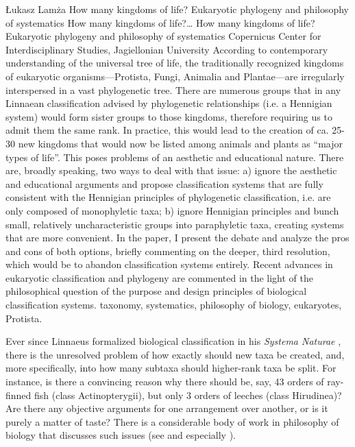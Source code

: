 \begin{artengenv}
	{Łukasz Lamża}
	{How many kingdoms of life? Eukaryotic phylogeny and philosophy of systematics}
	{How many kingdoms of life?\ldots}
	{How many kingdoms of life? Eukaryotic phylogeny and philosophy of systematics}
	{Copernicus Center for Interdisciplinary Studies, Jagiellonian University}
	{According to contemporary understanding of the universal tree of life, the traditionally recognized kingdoms of
		eukaryotic organisms---Protista, Fungi, Animalia and Plantae---are irregularly interspersed in a vast phylogenetic
		tree. There are numerous groups that in any Linnaean classification advised by phylogenetic relationships (i.e. a
		Hennigian system) would form sister groups to those kingdoms, therefore requiring us to admit them the same rank. In
		practice, this would lead to the creation of ca. 25-30 new kingdoms that would now be listed among animals and plants
		as ``major types of life''. This poses problems of an aesthetic and educational nature. There are, broadly speaking, two
		ways to deal with that issue: a) ignore the aesthetic and educational arguments and propose classification systems that
		are fully consistent with the Hennigian principles of phylogenetic classification, i.e. are only composed of
		monophyletic taxa; b) ignore Hennigian principles and bunch small, relatively uncharacteristic groups into paraphyletic
		taxa, creating systems that are more convenient. In the paper, I present the debate and analyze the pros and cons of
		both options, briefly commenting on the deeper, third resolution, which would be to abandon classification systems
		entirely. Recent advances in eukaryotic classification and phylogeny are commented in the light of the philosophical
		question of the purpose and design principles of biological classification systems.}
	{taxonomy, systematics, philosophy of biology, eukaryotes, Protista.}



\lettrine[loversize=0.13,lines=2,lraise=-0.05,nindent=0em,findent=0.2pt]%
{E}{}ver since Linnaeus formalized biological classification in his \textit{Systema Naturae}
\parencite{linnaeus_systema_1788},
there is the unresolved problem of how exactly should new taxa be created,
and, more specifically, into how many subtaxa should higher-rank taxa be split. For instance, is there a convincing
reason why there should be, say, 43 orders of ray-finned fish (class Actinopterygii), but only 3 orders of leeches
(class Hirudinea)? Are there any objective arguments for one arrangement over another, or is it purely a matter of
taste? There is a considerable body of work in philosophy of biology that discusses such issues
(see \cite{hull_effect_1965,hull_contemporary_1970,schuh_biological_2011} and especially \cite{mayr_classifications_2002}).


\end{artengenv}
